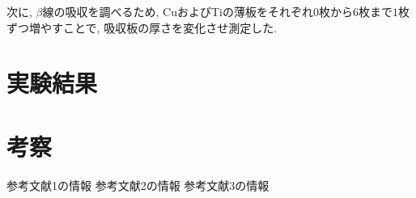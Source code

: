 \documentclass{jarticle}
\begin{document}
次に, $\beta$線の吸収を調べるため, $\mathrm{Cu}$および$\mathrm{Ti}$の薄板をそれぞれ$0$枚から$6$枚まで$1$枚ずつ増やすことで, 吸収板の厚さを変化させ測定した.



\section{実験結果}




\section{考察}





\begin{thebibliography}{99}

   参考文献1の情報
   参考文献2の情報
   参考文献3の情報

\end{thebibliography}
\end{document}
